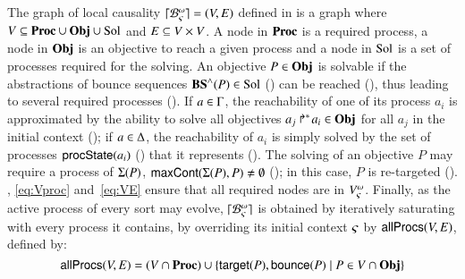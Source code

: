 The graph of local causality $\lceil \mathcal{B}_\varsigma^\omega\rceil = (V, E)$ defined in  is a graph where $V \subseteq \mathbf{Proc} \cup \mathbf{Obj} \cup \mathrm{Sol}$ and $E \subseteq V \times V$.
A node in $\mathbf{Proc}$ is a required process,
a node in $\mathbf{Obj}$ is an objective to reach a given process
and a node in $\mathrm{Sol}$ is a set of processes required for the solving.
An objective $P \in \mathbf{Obj}$ is solvable if the abstractions of bounce sequences $\mathbf{BS}^\wedge(P) \in \mathrm{Sol}$ () can be reached (), thus leading to several required processes ().
If $a \in \Gamma$, the reachability of one of its process $a_i$ is approximated by the ability to solve all objectives $\mbox{${a}_{j}\Rsh^*\!{a}_{i}$} \in \mathbf{Obj}$ for all $a_j$ in the initial context ();
if $a \in \Delta$, the reachability of $a_i$ is simply solved by the set of processes $\mathsf{procState}(a_i)$ () that it represents ().
The solving of an objective $P$ may require a process of $\Sigma(P)$, \ie $\mathsf{maxCont}(\Sigma(P), P) \neq \emptyset$ (); in this case, $P$ is re-targeted ().
, \eqref{eq:Vproc} and~\eqref{eq:VE} ensure that all required nodes are in $V_\varsigma^\omega$.
Finally, as the active process of every sort may evolve, $\lceil \mathcal{B}_\varsigma^\omega\rceil$ is obtained by iteratively saturating with every process it contains,
\ie by overriding its initial context $\varsigma$ by $\mathsf{allProcs}(V, E)$, defined by:
$$\mathsf{allProcs}(V, E) = (V \cap \mathbf{Proc}) \cup \{ \mathsf{target}(P), \mathsf{bounce}(P) \mid P \in V \cap \mathbf{Obj} \}$$

\begin{comment}
The reachability of a process $a_i$ is approximated by the ability to solve all objectives $\PHobjp{a}{j}{i}$ for all $a_j$ in the initial context.
To this end, the abstractions of bounce sequences (\pref{def:aBS}) solving these objectives are computed, leading to new required processes, and thus new objectives on other sorts.
Thus, the graph of local causality $\cwB = (\V, \E)$ defined in \pref{def:glc} is a graph where $\V \subset \Proc \cup \Obj \cup \Sol$ and $\E \subset \V \times \V$
in which edges link any required process $a_i$ in $\Proc$ to all corresponding objectives $P$ in $\Obj$,
and any objective $P$ to abstractions of bounce sequences $ps \in \Sol$ (\pref{def:aBS}) solving this objective;
such sets $ps$ then stand for new required processes.
In the case where a process $a_i$ belongs to a cooperative sort, it is directly linked to the set of the processes $\csState(a_i)$ (\pref{def:csState}) that it represents.
If the solving of an objective $P$ requires a process of $\PHsort(P)$, a continuity edge is added to re-target this objective (\pref{def:maxCont}).
Finally, as the active process of every sort may evolve, $\cwB$ is obtained iteratively by saturation with every process it contains,
\ie by overriding its initial context $\ctx$ by $\allprocs(\V, \E)$, defined by:
$$\allprocs(\V, \E) = (V \cap \Proc) \cup \{ \PHtarget(P), \PHbounce(P) \mid P \in \V \cap \Obj \}$$
\end{comment}

